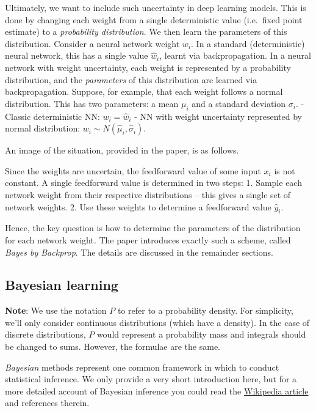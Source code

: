 \documentclass[11pt]{article}
\begin{document}
Ultimately, we want to include such uncertainty in deep learning models.
This is done by changing each weight from a single deterministic value
(i.e.~fixed point estimate) to a \emph{probability distribution}. We
then learn the parameters of this distribution. Consider a neural
network weight \(w_i\). In a standard (deterministic) neural network,
this has a single value \(\hat{w}_i\), learnt via backpropagation. In a
neural network with weight uncertainty, each weight is represented by a
probability distribution, and the \emph{parameters} of this distribution
are learned via backpropagation. Suppose, for example, that each weight
follows a normal distribution. This has two parameters: a mean \(\mu_i\)
and a standard deviation \(\sigma_i\). - Classic deterministic NN:
\(w_i = \hat{w}_i\) - NN with weight uncertainty represented by normal
distribution: \(w_i \sim N(\hat{\mu}_i, \hat{\sigma}_i)\).

An image of the situation, provided in the paper, is as follows.

Since the weights are uncertain, the feedforward value of some input
\(x_i\) is not constant. A single feedforward value is determined in two
steps: 1. Sample each network weight from their respective distributions
-- this gives a single set of network weights. 2. Use these weights to
determine a feedforward value \(\hat{y}_i\).

Hence, the key question is how to determine the parameters of the
distribution for each network weight. The paper introduces exactly such
a scheme, called \emph{Bayes by Backprop}. The details are discussed in
the remainder sections.

    \hypertarget{bayesian-learning}{%
\subsection{Bayesian learning}\label{bayesian-learning}}

\textbf{Note}: We use the notation \(P\) to refer to a probability
density. For simplicity, we'll only consider continuous distributions
(which have a density). In the case of discrete distributions, \(P\)
would represent a probability mass and integrals should be changed to
sums. However, the formulae are the same.

\emph{Bayesian} methods represent one common framework in which to
conduct statistical inference. We only provide a very short introduction
here, but for a more detailed account of Bayesian inference you could
read the
\href{https://en.wikipedia.org/wiki/Bayesian_inference}{Wikipedia
article} and references therein.
\end{document}

